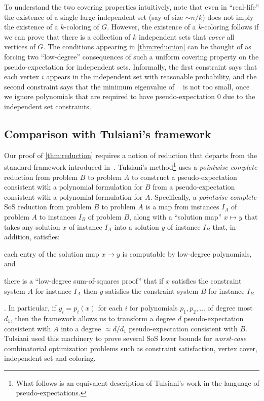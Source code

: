 \documentclass[10pt,a4paper]{article}
\theoremstyle{definition}
\DeclareMathOperator{\pE}{\tilde{\mathbb{E}}}
\newcommand{\numcolors}{k}
\begin{document}
To understand the two covering properties intuitively, note that even in ``real-life'' the existence of a single large independent set (say of size $\sim n/k$) does not imply the existence of a $k$-coloring of $G$. However, the existence of a $k$-coloring follows if we can prove that there is a collection of $\numcolors$ independent sets that \emph{cover} all vertices of $G$. The conditions appearing in \cref{thm:reduction} can be thought of as forcing two ``low-degree'' consequences of such a uniform covering property on the pseudo-expectation for independent sets. Informally, the first constraint says that each vertex $i$ appears in the independent set with reasonable probability, and the second constraint says that the minimum eigenvalue of $\pE$ is not too small, once we ignore polynomials that are required to have pseudo-expectation $0$ due to the independent set constraints.


\subsection{Comparison with Tulsiani's framework} 
\label{sec:tul}

Our proof of \cref{thm:reduction} requires a notion of reduction that departs from the standard framework introduced in~\cite{DBLP:conf/stoc/Tulsiani09}. Tulsiani's method\footnote{What follows is an equivalent description of Tulsiani's work in the language of pseudo-expectations.} uses a \emph{pointwise complete} reduction from problem $B$ to problem $A$ to construct a pseudo-expectation consistent with a polynomial formulation for $B$ from a pseudo-expectation consistent with a polynomial formulation for $A$. Specifically, a \emph{pointwise complete} SoS reduction from problem $B$ to problem $A$ is a map from instances $I_A$ of problem $A$ to instances $I_B$ of problem $B$, along with a ``solution map'' $x \mapsto y$ 
that takes any solution $x$ of instance $I_A$ into a solution $y$ of instance $I_B$ that, in addition, satisfies: \begin{inparaenum}[(1)] \item each entry of the solution map $x\rightarrow y$ is computable by low-degree polynomials, and \item there is a ``low-degree sum-of-squares proof'' that if $x$ satisfies the constraint system $A$ for instance $I_A$ then $y$ satisfies the constraint system $B$ for instance $I_B$ \end{inparaenum}. In particular, if $y_i = p_i(x)$ for each $i$ for polynomials $p_1, p_2, \ldots$ of degree most $d_1$, then the framework allows us to transform a degree $d$ pseudo-expectation consistent with $A$ into a degree $\approx d/d_1$ pseudo-expectation consistent with $B$.  Tulsiani used this machinery to prove several SoS lower bounds for \emph{worst-case} combinatorial optimization problems such as constraint satisfaction, vertex cover, independent set and coloring. 
\end{document}
